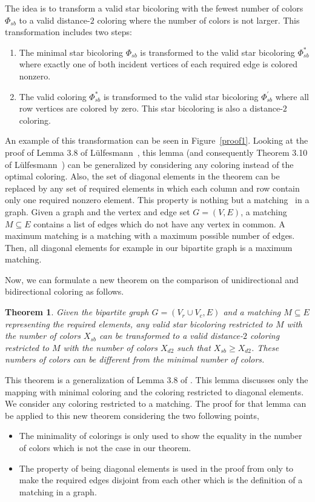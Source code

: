 \documentclass[12pt, twoside,a4paper,toc=bibliography]{scrbook}
\newtheorem{theorem}{Theorem}
\newcommand{\figref}[1]{Figure~\protect\ref{#1}}
\begin{document}
The idea is to transform a valid star bicoloring with the fewest number of colors $\Phi_{sb}$ to
a valid distance-$2$ coloring where the number of colors is not larger.
This transformation includes two steps:
\begin{enumerate}
\item The minimal star bicoloring $\Phi_{sb}$ is transformed
to the valid star bicoloring $\Phi_{sb}^{*}$
where exactly one of both incident vertices of each required edge is colored nonzero.
\item The valid coloring $\Phi_{sb}^{*}$ is transformed
to the valid star bicoloring $\Phi_{sb}^{'}$ where all row vertices are colored by zero.
This star bicoloring is also a distance-$2$ coloring.
\end{enumerate}
An example of this transformation can be seen in \figref{proof1}.
Looking at the proof of Lemma 3.8 of Lülfesmann~\cite{Lulfesmann2012Fap}, this lemma (and consequently Theorem 3.10 of Lülfesmann~\cite{Lulfesmann2012Fap})
can be generalized by considering any coloring instead of the optimal coloring.
Also, the set of diagonal elements in the theorem
can be replaced by any set of required elements
in which each column and row contain only one required nonzero element.
This property is nothing but a matching~\cite{bondy2008graph} in a graph.
Given a graph and the vertex and edge set $G=(V,E)$, a matching $M\subseteq E$ contains
a list of edges which do not have any vertex in common.
A maximum matching is a matching with a maximum possible number of edges.
Then, all diagonal elements for example in our bipartite graph is a maximum matching.

Now, we can formulate a new theorem on the comparison of unidirectional and
bidirectional coloring as follows.
\begin{theorem}
\label{t.matching}
Given the bipartite graph $G=(V_r\cup V_c,E)$ and a matching $M\subseteq E$ representing
the required elements, any valid star bicoloring restricted to $M$
with the number of colors $X_{sb}$
can be transformed to a valid distance-$2$ coloring restricted to $M$
with the number of colors $X_{d2}$ such that $X_{sb} \geq X_{d2}$.
These numbers of colors can be different from the minimal number of colors.
\end{theorem}
This theorem is a generalization of Lemma 3.8 of \cite{Lulfesmann2012Fap}.
This lemma discusses only the mapping with minimal coloring
and the coloring restricted to diagonal elements. We consider any coloring
restricted to a matching.
The proof for that lemma can be applied to this new theorem considering the two following points,
\begin{itemize}
\item The minimality of colorings is only used to show the equality in the number of colors which is not
the case in our theorem.
\item The property of being diagonal elements is used in the proof from \cite{Lulfesmann2012Fap} only to
make the required edges disjoint from each other which is the definition of a matching in a graph.
\end{itemize}
\end{document}
